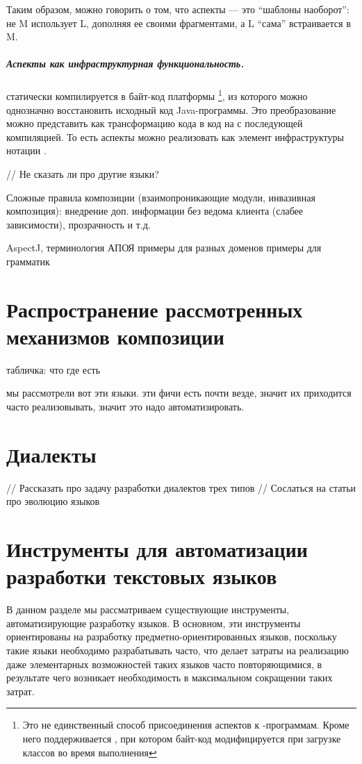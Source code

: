 Таким образом, можно говорить о том, что аспекты --- это ``шаблоны наоборот'': не M использует L, дополняя ее своими фрагментами, а L ``сама'' встраивается в M.

\paragraph*{Аспекты как инфраструктурная функциональность.}  статически компилируется в байт-код платформы \footnote{Это не единственный способ присоединения аспектов к -программам. Кроме него поддерживается , при котором байт-код модифицируется при загрузке классов во время выполнения}, из которого можно однозначно восстановить исходный код Java-программы. Это преобразование можно представить как трансформацию кода  в код на  с последующей компиляцией. То есть аспекты можно реализовать как элемент инфраструктуры нотации .

// Не сказать ли про другие языки?


Сложные правила композиции (взаимопроникающие модули, инвазивная композиция): внедрение доп. информации без ведома клиента (слабее зависимости), прозрачность и т.д.
	
	AspectJ, терминология
	АПОЯ
		примеры для разных доменов
		примеры для грамматик


\chapter{Распространение рассмотренных механизмов композиции}

табличка: что где есть

мы рассмотрели вот эти языки. эти фичи есть почти везде, значит их приходится часто реализовывать, значит это надо автоматизировать.

\chapter{Диалекты}

// Рассказать про задачу разработки диалектов трех типов
// Сослаться на статьи про эволюцию языков

\chapter{Инструменты для автоматизации разработки текстовых языков}

В данном разделе мы рассматриваем существующие инструменты, автоматизирующие разработку языков. В основном, эти инструменты ориентированы на разработку предметно-ориентированных языков, поскольку такие языки необходимо разрабатывать часто, что делает затраты на реализацию даже элементарных возможностей таких языков часто повторяющимися, в результате чего возникает необходимость в максимальном сокращении таких затрат.

